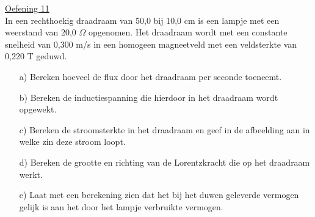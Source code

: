 \documentclass[a4paper,12pt,twoside]{article}%
\begin{document}
\underline{Oefening 11}\\
In een rechthoekig draadraam van 50,0 bij 10,0 cm is een lampje met een weerstand van 20,0 $\Omega$ opgenomen. Het draadraam wordt met een constante snelheid van 0,300 m/s in een homogeen magneetveld met een veldsterkte van 0,220 T geduwd.
\begin{figure}[!h]
	\centering
\end{figure}
\begin{enumerate}
	\item[a)] Bereken hoeveel de flux door het draadraam per seconde toeneemt. 
	\item[b)] Bereken de inductiespanning die hierdoor in het draadraam wordt opgewekt. 
	\item[c)] Bereken de stroomsterkte in het draadraam en geef in de afbeelding aan in welke zin deze stroom loopt. 
	\item[d)] Bereken de grootte en richting van de Lorentzkracht die op het draadraam werkt. 
	\item[e)] Laat met een berekening zien dat het bij het duwen geleverde vermogen gelijk is aan het door het lampje verbruikte vermogen.
\end{enumerate}
\end{document}
